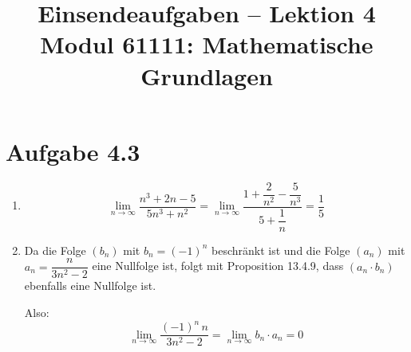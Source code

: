 \documentclass[a4paper,12pt]{article}
\title{Einsendeaufgaben -- Lektion 4\\[0.5em]
\large Modul 61111: Mathematische Grundlagen}
\author{}
\date{}
\begin{document}
\maketitle

\section*{Aufgabe 4.3}

\begin{enumerate}[label=\alph*)]

    \item
    \[
        \lim_{n \to \infty} \frac{n^3 + 2n - 5}{5n^3 + n^2}
        = \lim_{n \to \infty} \frac{1 + \dfrac{2}{n^2} - \dfrac{5}{n^3}}{5 + \dfrac{1}{n}}
        = \frac{1}{5}
    \]

    \item
    Da die Folge $(b_n)$ mit $b_n = (-1)^n$ beschränkt ist und die Folge $(a_n)$
    mit $a_n = \dfrac{n}{3n^2 - 2}$ eine Nullfolge ist,
    folgt mit Proposition 13.4.9, dass $(a_n \cdot b_n)$ ebenfalls eine Nullfolge ist.

    Also:
    \[
        \lim_{n \to \infty} \frac{(-1)^n \, n}{3n^2 - 2}
        = \lim_{n \to \infty} b_n \cdot a_n = 0
    \]

\end{enumerate}
\end{document}
